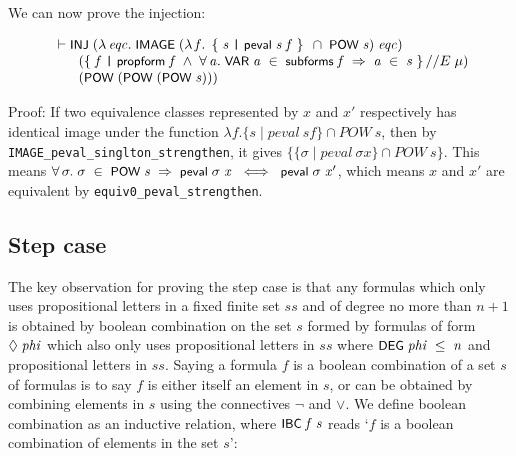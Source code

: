 \documentclass[letterpaper]{article}
\renewcommand{\HOLConst}[1]{{\textsf{\upshape\small #1}}}
\renewcommand{\HOLinline}[1]{\ensuremath{#1}}
\newenvironment{holmath}{\begin{displaymath}\begin{array}{l}}{\end{array}\end{displaymath}\ignorespacesafterend}
\begin{document}
We can now prove the injection:

\begin{holmath}
  \ensuremath{\HOLTokenTurnstile}\HOLConst{INJ}\;(\HOLTokenLambda{}\HOLBoundVar{eqc}.\;\HOLConst{IMAGE}\;(\HOLTokenLambda{}\HOLBoundVar{f}.\;\HOLTokenLeftbrace{}\HOLBoundVar{s}\;\HOLTokenBar{}\;\HOLConst{peval}\;\HOLBoundVar{s}\;\HOLBoundVar{f}\HOLTokenRightbrace{}\;\HOLSymConst{\HOLTokenInter{}}\;\HOLConst{POW}\;\HOLFreeVar{s})\;\HOLBoundVar{eqc})\\
\;\;\;\;\;\;\;(\HOLTokenLeftbrace{}\HOLBoundVar{f}\;\HOLTokenBar{}\;\HOLConst{propform}\;\HOLBoundVar{f}\;\HOLSymConst{\HOLTokenConj{}}\;\HOLSymConst{\HOLTokenForall{}}\HOLBoundVar{a}.\;\HOLConst{VAR}\;\HOLBoundVar{a}\;\HOLSymConst{\HOLTokenIn{}}\;\HOLConst{subforms}\;\HOLBoundVar{f}\;\HOLSymConst{\HOLTokenImp{}}\;\HOLBoundVar{a}\;\HOLSymConst{\HOLTokenIn{}}\;\HOLFreeVar{s}\HOLTokenRightbrace{}\HOLSymConst{//E}\;\HOLFreeVar{\ensuremath{\mu}})\\
\;\;\;\;\;\;\;(\HOLConst{POW}\;(\HOLConst{POW}\;(\HOLConst{POW}\;\HOLFreeVar{s})))
\end{holmath}

Proof: If two equivalence classes represented by $x$ and $x'$ respectively has identical image under the function $\lambda f. \{s \mid peval\ s f\} \cap POW \ s$, then by \texttt{IMAGE_peval_singlton_strengthen}, it gives $ \{\{\sigma \mid peval\ \sigma x\} \cap POW\ s\}$. This means \HOLinline{\HOLSymConst{\HOLTokenForall{}}\HOLBoundVar{\ensuremath{\sigma}}.\;\HOLBoundVar{\ensuremath{\sigma}}\;\HOLSymConst{\HOLTokenIn{}}\;\HOLConst{POW}\;\HOLFreeVar{s}\;\HOLSymConst{\HOLTokenImp{}}\;\HOLConst{peval}\;\HOLBoundVar{\ensuremath{\sigma}}\;\HOLFreeVar{x}\;\HOLSymConst{\HOLTokenEquiv{}}\;\HOLConst{peval}\;\HOLBoundVar{\ensuremath{\sigma}}\;\HOLFreeVar{x\sp{\prime}}}, which means $x$ and $x'$ are equivalent by \texttt{equiv0_peval_strengthen}.



\subsection{Step case}

The key observation for proving the step case is that any formulas which only uses propositional letters in a fixed finite set $ss$ and of degree no more than $n+1$ is obtained by boolean combination on the set $s$ formed by formulas of form \HOLinline{\HOLSymConst{\ensuremath{\Diamond}}\;\HOLFreeVar{phi}} which also only uses propositional letters in $ss$ where \HOLinline{\HOLConst{DEG}\;\HOLFreeVar{phi}\;\HOLSymConst{\HOLTokenLeq{}}\;\HOLFreeVar{n}} and propositional letters in $ss$. Saying a formula $f$ is a boolean combination of a set $s$ of formulas is to say $f$ is either itself an element in $s$, or can be obtained by combining elements in $s$ using the connectives $\lnot$ and $\lor$. We define boolean combination as an inductive relation, where \HOLinline{\HOLConst{IBC}\;\HOLFreeVar{f}\;\HOLFreeVar{s}} reads `$f$ is a boolean combination of elements in the set $s$':
\end{document}
